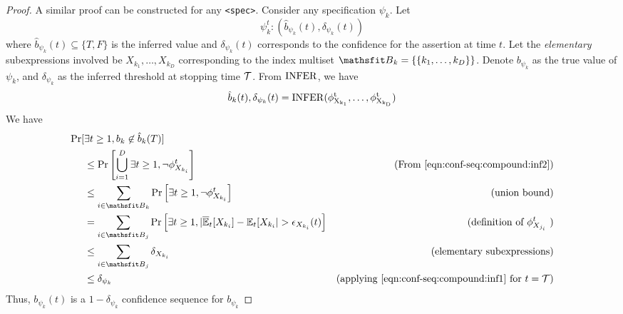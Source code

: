 \begin{proof}
A similar proof can be constructed for any \texttt{<spec>}. 
Consider any specification $\psi_k$. Let
\begin{equation}
    \psi_k^t : (\hat{b}_{\psi_k}(t), \delta_{\psi_k}(t))
\end{equation}
where $\hat{b}_{\psi_k}(t) \subseteq \{T, F\}$ is the inferred value and $\delta_{\psi_k}(t)$ corresponds to the confidence for the assertion at time $t$. 
Let the \textit{elementary} subexpressions involved be $X_{k_1}, \dots, X_{k_D}$ corresponding to the index multiset $\etB_k = \{\{k_1, \dots, k_D \}\}$.
Denote $b_{\psi_k}$ as the true value of $\psi_k$, and $\delta_{\psi_k}$ as the inferred threshold at stopping time ${\mathcal{T}}$.
From $\rm{INFER}$, we have
\begin{equation}
\hat{b}_k(t), \delta_{\psi_k}(t) = \rm{INFER}(\phi^t_{X_{k_1}}, \dots, \phi^t_{X_{k_D}})
\label{eqn:conf-seq:compound:inf2}
\end{equation}
We have
\begin{align*}
     \Pr[&\exists t \geq 1, b_k \not\in \hat{b}_k(T)]\\
        &\leq \Pr\left[\bigcup\limits_{i = 1}^{D} \exists t \geq 1,  \neg \phi_{X_{k_i}}^t \right] & \text{(From \ref{eqn:conf-seq:compound:inf2})} \\
      &\leq \sum\limits_{i\in \etB_k}\Pr\left[\exists t \geq 1, \neg \phi^t_{X_{k_i}}\right] & \text{(union bound)} \\
      &= \sum\limits_{i\in \etB_j}\Pr\left[\exists t \geq 1, |\BarE_t[X_{k_i}] - \E_t[X_{k_i}| > \epsilon_{X_{k_i}}(t)\right] & \text{(definition of $\phi^t_{X_{j_i}}$ )} \\
      &\leq \sum\limits_{i\in \etB_j} \delta_{X_{k_i}} & \text{(elementary subexpressions)} \\
      &\leq \delta_{\psi_k} & \text{(applying \ref{eqn:conf-seq:compound:inf1} for $t = \gT$)}
\end{align*}
Thus, $b_{\psi_k}(t)$ is a $1-\delta_{\psi_k}$ confidence sequence for $b_{\psi_k}$
\end{proof}




